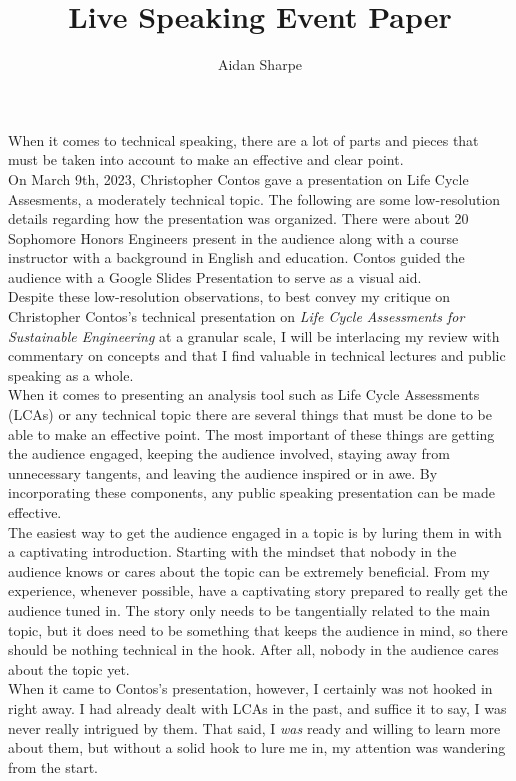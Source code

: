 \documentclass[]{mla}
\title{Live Speaking Event Paper}
\author{Aidan Sharpe}
\begin{document}
    
    When it comes to technical speaking, there are a lot of parts and pieces that must be taken into account to make an effective and clear point. 
    \\
    On March 9th, 2023, Christopher Contos gave a presentation on Life Cycle Assesments, a moderately technical topic. The following are some low-resolution details regarding how the presentation was organized. There were about 20 Sophomore Honors Engineers present in the audience along with a course instructor with a background in English and education. Contos guided the audience with a Google Slides Presentation to serve as a visual aid.
    \\
    Despite these low-resolution observations, to best convey my critique on Christopher Contos's technical presentation on \textit{Life Cycle Assessments for Sustainable Engineering} at a granular scale, I will be interlacing my review with commentary on concepts and that I find valuable in technical lectures and public speaking as a whole.
    \\
    When it comes to presenting an analysis tool such as Life Cycle Assessments (LCAs) or any technical topic there are several things that must be done to be able to make an effective point. The most important of these things are getting the audience engaged, keeping the audience involved, staying away from unnecessary tangents, and leaving the audience inspired or in awe. By incorporating these components, any public speaking presentation can be made effective.
    \\    
    The easiest way to get the audience engaged in a topic is by luring them in with a captivating introduction. Starting with the mindset that nobody in the audience knows or cares about the topic can be extremely beneficial. From my experience, whenever possible, have a captivating story prepared to really get the audience tuned in. The story only needs to be tangentially related to the main topic, but it does need to be something that keeps the audience in mind, so there should be nothing technical in the hook. After all, nobody in the audience cares about the topic yet.
    \\
    When it came to Contos's presentation, however, I certainly was not hooked in right away. I had already dealt with LCAs in the past, and suffice it to say, I was never really intrigued by them. That said, I \textit{was} ready and willing to learn more about them, but without a solid hook to lure me in, my attention was wandering from the start.
    \\
\end{document}
